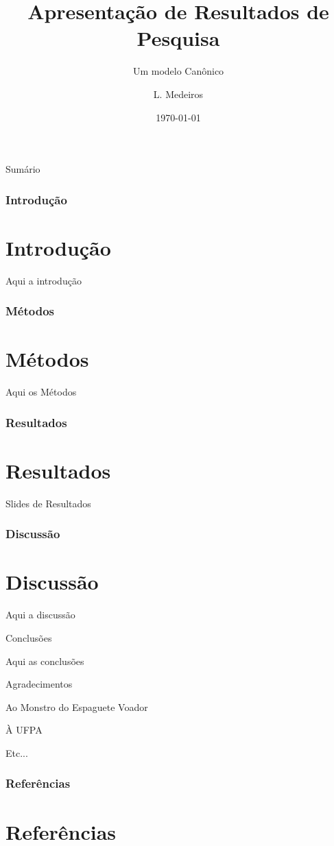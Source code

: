 \documentclass[11pt]{beamer}
\author{L. Medeiros}
\title{Apresentação de Resultados de Pesquisa}
\subtitle{Um modelo Canônico}
\institute{gECo lab \\ UAEF-UFCG}
\date{\today}
\begin{document}
\begin{frame}
\titlepage
\end{frame}


\begin{frame}{Sumário}
		\centering
		\tableofcontents
\end{frame}





\begin{frame}
\frametitle{Introdução}
\section{Introdução}
Aqui a introdução

\cite{Simon1978}
\end{frame}



\begin{frame}
\frametitle{Métodos}
\section{Métodos}

Aqui os Métodos 
\cite{Almeida2017}

\end{frame}


\begin{frame}
\frametitle{Resultados}
\section{Resultados}

Slides de Resultados


\end{frame}


\begin{frame}
\frametitle{Discussão}
\section{Discussão}

Aqui a discussão

\end{frame}



\begin{frame}{Conclusões}

Aqui as conclusões

\end{frame}


\begin{frame}{Agradecimentos}

Ao Monstro do Espaguete Voador

À UFPA

Etc...

\end{frame}

\begin{frame}[allowframebreaks]
\frametitle{Referências}
       \section{Referências}



\end{frame}
\end{document}
